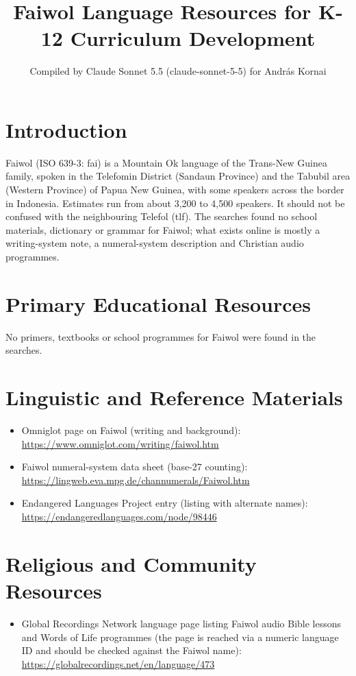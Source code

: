 \documentclass[12pt]{article}
\title{Faiwol Language Resources for K-12 Curriculum Development}
\author{Compiled by Claude Sonnet 5.5 (claude-sonnet-5-5) for Andr\'as Kornai}
\date{}
\begin{document}
\maketitle

\section{Introduction}
Faiwol (ISO 639-3: fai) is a Mountain Ok language of the Trans-New Guinea family, spoken in the Telefomin District (Sandaun Province) and the Tabubil area (Western Province) of Papua New Guinea, with some speakers across the border in Indonesia. Estimates run from about 3,200 to 4,500 speakers. It should not be confused with the neighbouring Telefol (tlf). The searches found no school materials, dictionary or grammar for Faiwol; what exists online is mostly a writing-system note, a numeral-system description and Christian audio programmes.

\section{Primary Educational Resources}
No primers, textbooks or school programmes for Faiwol were found in the searches.

\section{Linguistic and Reference Materials}
\begin{itemize}
\item Omniglot page on Faiwol (writing and background): \url{https://www.omniglot.com/writing/faiwol.htm}
\item Faiwol numeral-system data sheet (base-27 counting): \url{https://lingweb.eva.mpg.de/channumerals/Faiwol.htm}
\item Endangered Languages Project entry (listing with alternate names): \url{https://endangeredlanguages.com/node/98446}
\end{itemize}

\section{Religious and Community Resources}
\begin{itemize}
\item Global Recordings Network language page listing Faiwol audio Bible lessons and Words of Life programmes (the page is reached via a numeric language ID and should be checked against the Faiwol name): \url{https://globalrecordings.net/en/language/473}
\end{itemize}
\end{document}
